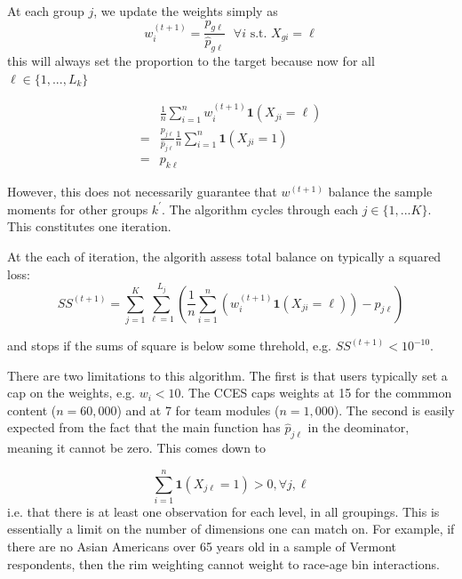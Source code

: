 \documentclass[11pt]{article}
\begin{document}
At each group \(j\), we update the weights simply as
\[w_{i}^{(t+1)} = \frac{p_{g\ell}}{\widehat{p}_{g\ell}} ~~~\forall i \text{ s.t. } X_{gi} = \ell \]
this will always set the proportion to the target because now for all \( \ell \in \{1, ..., L_k\}\)

\begin{align}
&\frac{1}{n}\sum^n_{i=1}w_i^{(t+1)} \mathbf{1}(X_{ji} = \ell)\\
=&\frac{p_{j\ell}}{\hat{p}_{j\ell}}\frac{1}{n}\sum^n_{i=1}\mathbf{1}(X_{ji} = 1)\\
=& p_{k\ell}
\end{align}

However, this does not necessarily guarantee that \(w^{(t+1)}\) balance the sample moments for other groups \(k^{\prime}\). The algorithm cycles through each \(j \in \{1, ... K\}\). This constitutes one iteration.

At the each of iteration, the algorith assess total balance on typically a  squared loss:
\[SS^{(t+1)} = \sum^K_{j=1}\sum^{L_{j}}_{\ell = 1}\left(\frac{1}{n}\sum^n_{i=1}(w_i^{(t+1)}\mathbf{1}(X_{ji} = \ell)) - p_{j\ell}\right)\]

and stops if the sums of square is below some threhold, e.g. \(SS^{(t+1)} < 10^{-10}.\)

There are two limitations to this algorithm. The first is that users typically set a cap on the weights, e.g. \(w_{i} < 10\). The CCES caps weights at 15 for the commmon content (\(n = 60,000\)) and at 7 for team modules (\(n = 1,000\)). The second is easily expected from the fact that the main function has \(\widehat{p}_{j\ell}\) in the deominator, meaning it cannot be zero. This comes down to 

\[\sum^n_{i=1}\mathbf{1}(X_{j\ell} = 1) > 0, \forall j, \ell\]
i.e. that there is at least one observation for each level, in all groupings. This is essentially a limit on the number of dimensions one can match on. For example, if there are no Asian Americans over 65 years old in a sample of Vermont respondents, then the rim weighting cannot weight to race-age bin interactions.
\end{document}
